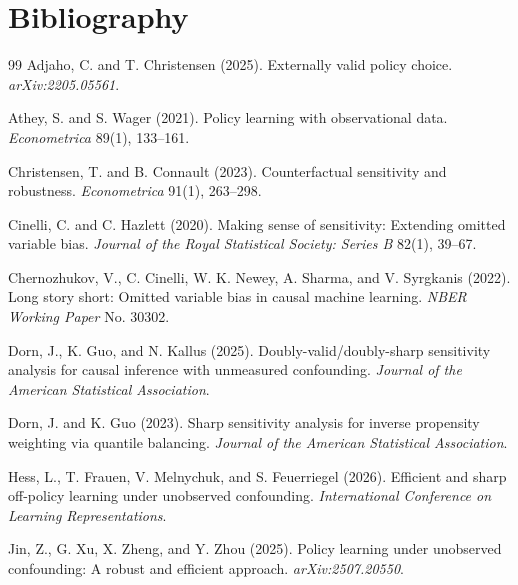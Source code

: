 \documentclass[11pt]{article}
\theoremstyle{definition}
\theoremstyle{plain}
\theoremstyle{remark}
\begin{document}
\section*{Bibliography}
\begin{thebibliography}{99}
Adjaho, C. and T. Christensen (2025).
\newblock Externally valid policy choice.
\newblock \emph{arXiv:2205.05561}.

Athey, S. and S. Wager (2021).
\newblock Policy learning with observational data.
\newblock \emph{Econometrica} 89(1), 133--161.

Christensen, T. and B. Connault (2023).
\newblock Counterfactual sensitivity and robustness.
\newblock \emph{Econometrica} 91(1), 263--298.

Cinelli, C. and C. Hazlett (2020).
\newblock Making sense of sensitivity: Extending omitted variable bias.
\newblock \emph{Journal of the Royal Statistical Society: Series B} 82(1), 39--67.

Chernozhukov, V., C. Cinelli, W. K. Newey, A. Sharma, and V. Syrgkanis (2022).
\newblock Long story short: Omitted variable bias in causal machine learning.
\newblock \emph{NBER Working Paper} No. 30302.

Dorn, J., K. Guo, and N. Kallus (2025).
\newblock Doubly-valid/doubly-sharp sensitivity analysis for causal inference with unmeasured confounding.
\newblock \emph{Journal of the American Statistical Association}.

Dorn, J. and K. Guo (2023).
\newblock Sharp sensitivity analysis for inverse propensity weighting via quantile balancing.
\newblock \emph{Journal of the American Statistical Association}.

Hess, L., T. Frauen, V. Melnychuk, and S. Feuerriegel (2026).
\newblock Efficient and sharp off-policy learning under unobserved confounding.
\newblock \emph{International Conference on Learning Representations}.

Jin, Z., G. Xu, X. Zheng, and Y. Zhou (2025).
\newblock Policy learning under unobserved confounding: A robust and efficient approach.
\newblock \emph{arXiv:2507.20550}.


\end{thebibliography}
\end{document}
